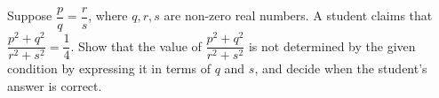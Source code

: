 Suppose $\dfrac {p}{q}=\dfrac {r}{s}$, where $q,r,s$ are non-zero real numbers. A student claims that $\dfrac{p^2+q^2}{r^2+s^2}=\dfrac{1}{4}$. Show that the value of $\dfrac{p^2+q^2}{r^2+s^2}$ is not determined by the given condition by expressing it in terms of $q$ and $s$, and decide when the student's answer is correct.
